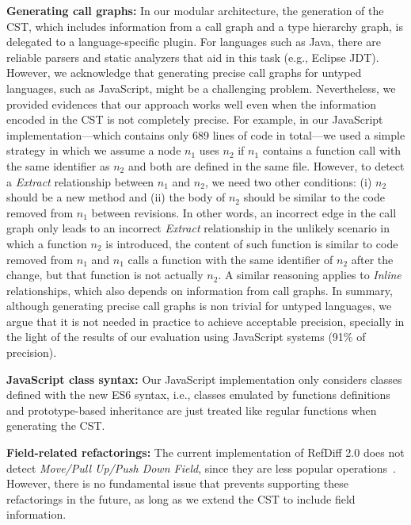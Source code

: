 \noindent\textbf{Generating call graphs:} In our modular architecture, the generation of the CST, which includes information from a call graph and a type hierarchy graph, is delegated to a language-specific plugin.
For languages such as Java, there are reliable parsers and static analyzers that aid in this task (e.g., Eclipse JDT).
However, we acknowledge that generating precise call graphs for untyped languages, such as JavaScript, might be a challenging problem.
Nevertheless, we provided evidences that our approach works well even when the information encoded in the CST is not completely precise.
For example, in our JavaScript implementation---which contains only 689 lines of code in total---we used a simple strategy in which we assume a node $n_1$ uses $n_2$ if $n_1$ contains a function call with the same identifier as $n_2$ and both are defined in the same file.
However, to detect a \emph{Extract} relationship between $n_1$ and $n_2$, we need two other conditions: (i) $n_2$ should be a new method and (ii) the body of $n_2$ should be similar to the code removed from $n_1$ between revisions.
In other words, an incorrect edge in the call graph only leads to an incorrect \emph{Extract} relationship in the unlikely scenario in which a function $n_2$ is introduced, the content of such function is similar to code removed from $n_1$ and $n_1$ calls a function with the same identifier of $n_2$ after the change, but that function is not actually $n_2$.
A similar reasoning applies to \emph{Inline} relationships, which also depends on information from call graphs.
In summary, although generating precise call graphs is non trivial for untyped languages, we argue that it is not needed in practice to achieve acceptable  precision, specially in the light of the results of our evaluation using JavaScript systems (91\% of precision).

\noindent\textbf{JavaScript class syntax:} Our JavaScript implementation only considers classes defined with the new ES6 syntax, i.e., classes emulated by  functions definitions and prototype-based inheritance are just treated like regular functions when generating the CST.

\noindent\textbf{Field-related refactorings:} The current implementation of RefDiff 2.0 does not detect \emph{Move/Pull Up/Push Down Field}, since they are less popular operations~\cite{fse2016-why-we-refactor}. However, there is no fundamental issue that prevents supporting these refactorings in the future, as long as we extend the CST to include field information.

